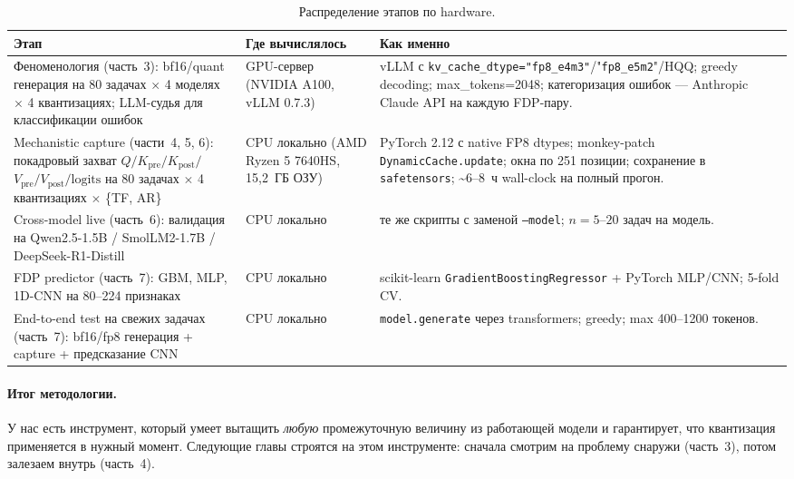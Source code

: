 \documentclass[a4paper,12pt]{article}
\begin{document}
\begin{table}[H]
\centering
\caption{Распределение этапов по hardware.}
\label{tab:hw}
\small
\begin{tabularx}{\textwidth}{p{3.5cm}p{3.5cm}X}
\toprule
Этап & Где вычислялось & Как именно \\
\midrule
Феноменология (часть~3): bf16/quant генерация на 80 задачах
$\times$ 4 моделях $\times$ 4 квантизациях; LLM-судья для классификации
ошибок &
GPU-сервер (NVIDIA A100, vLLM 0.7.3) &
vLLM с \texttt{kv\_cache\_dtype="fp8\_e4m3"}/"\texttt{fp8\_e5m2}"/HQQ;
greedy decoding; max\_tokens=2048; категоризация ошибок --- Anthropic
Claude API на каждую FDP-пару. \\
\midrule
Mechanistic capture (части~4, 5, 6): покадровый захват
$Q/K_\text{pre}/K_\text{post}/$$V_\text{pre}/V_\text{post}/\text{logits}$
на 80 задачах $\times$ 4 квантизациях $\times$ \{TF, AR\} &
CPU локально (AMD Ryzen 5 7640HS, 15{,}2~ГБ ОЗУ) &
PyTorch 2.12 с native FP8 dtypes; monkey-patch \texttt{DynamicCache.update};
окна по 251 позиции; сохранение в \texttt{safetensors};
\textasciitilde 6--8~ч wall-clock на полный прогон. \\
\midrule
Cross-model live (часть~6): валидация на Qwen2.5-1.5B / SmolLM2-1.7B /
DeepSeek-R1-Distill &
CPU локально &
те же скрипты с заменой \texttt{--model}; $n = 5\text{--}20$ задач на модель. \\
\midrule
FDP predictor (часть~7): GBM, MLP, 1D-CNN на 80--224 признаках &
CPU локально &
scikit-learn \texttt{GradientBoostingRegressor} + PyTorch MLP/CNN; 5-fold CV. \\
\midrule
End-to-end test на свежих задачах (часть~7): bf16/fp8 генерация +
capture + предсказание CNN &
CPU локально &
\texttt{model.generate} через transformers; greedy; max 400--1200
токенов. \\
\bottomrule
\end{tabularx}
\end{table}

\paragraph{Итог методологии.} У нас есть инструмент, который умеет
вытащить \textit{любую} промежуточную величину из работающей модели и
гарантирует, что квантизация применяется в нужный момент. Следующие
главы строятся на этом инструменте: сначала смотрим на проблему
снаружи (часть~3), потом залезаем внутрь (часть~4).

\clearpage
\end{document}
